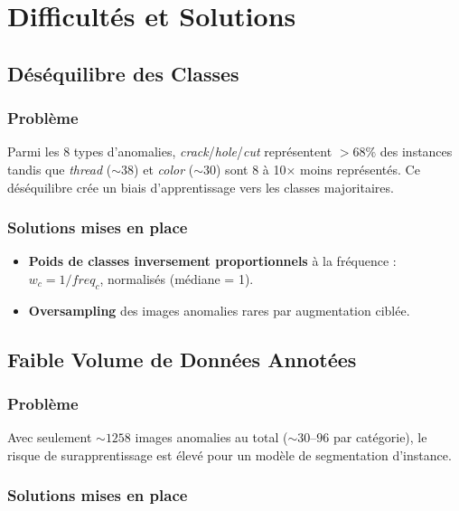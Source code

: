 \documentclass[12pt, a4paper]{report}
\begin{document}
\newpage

\chapter{Difficultés et Solutions}

\section{Déséquilibre des Classes}

\subsection{Problème}

Parmi les 8 types d'anomalies, \textit{crack}/\textit{hole}/\textit{cut} représentent $>68\%$ des instances tandis que \textit{thread} ($\sim38$) et \textit{color} ($\sim30$) sont 8 à 10$\times$ moins représentés. Ce déséquilibre crée un biais d'apprentissage vers les classes majoritaires.

\subsection{Solutions mises en place}

\begin{itemize}
  \item \textbf{Poids de classes inversement proportionnels} à la fréquence : $w_c = 1/freq_c$, normalisés (médiane = 1).
  \item \textbf{Oversampling} des images anomalies rares par augmentation ciblée.
\end{itemize}

\section{Faible Volume de Données Annotées}

\subsection{Problème}

Avec seulement $\sim1258$ images anomalies au total ($\sim30$--$96$ par catégorie), le risque de surapprentissage est élevé pour un modèle de segmentation d'instance.

\subsection{Solutions mises en place}
\end{document}
